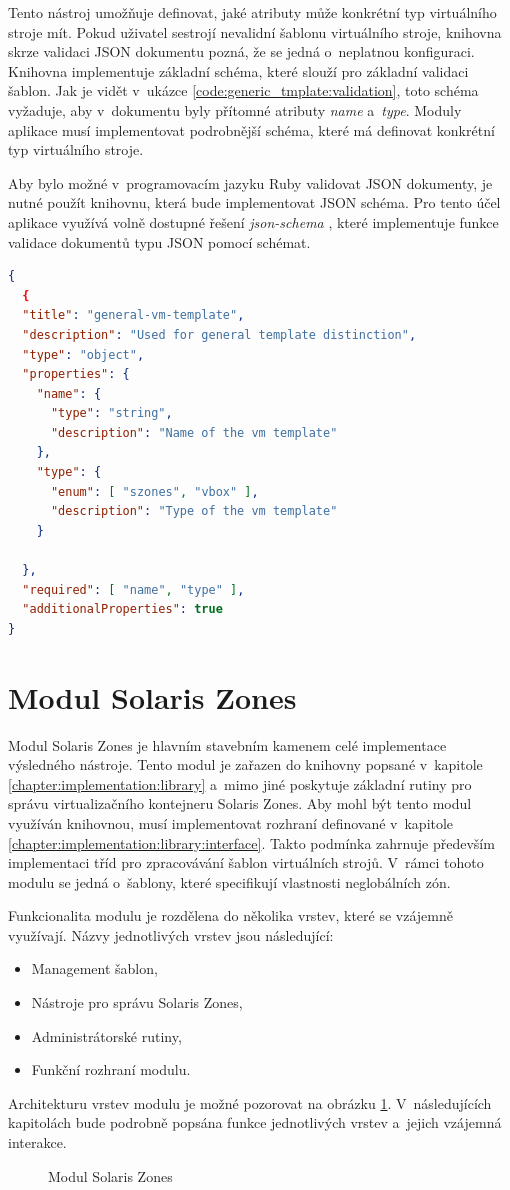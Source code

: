 Tento nástroj umožňuje definovat, jaké atributy může konkrétní typ virtuálního stroje mít. Pokud uživatel sestrojí
nevalidní šablonu virtuálního stroje, knihovna skrze validaci JSON dokumentu pozná, že se jedná o~neplatnou konfiguraci. Knihovna
implementuje základní schéma, které slouží pro základní validaci šablon. Jak je vidět v~ukázce \ref{code:generic_tmplate:validation},
toto schéma vyžaduje, aby v~dokumentu byly přítomné atributy \textit{name} a~\textit{type}. Moduly aplikace musí implementovat
podrobnější schéma, které má definovat konkrétní typ virtuálního stroje.

Aby bylo možné v~programovacím jazyku Ruby validovat JSON dokumenty, je nutné použít knihovnu, která bude implementovat
JSON schéma. Pro tento účel aplikace využívá volně dostupné řešení \textit{json-schema} \cite{json:schema:ruby}, které implementuje
funkce validace dokumentů typu JSON pomocí schémat.
\begin{lstlisting}[language=json, caption={Schéma generické šablony}, float, label={code:generic_tmplate:validation}]  
{
  {
  "title": "general-vm-template",
  "description": "Used for general template distinction",
  "type": "object",
  "properties": {
    "name": {
      "type": "string",
      "description": "Name of the vm template"
    },
    "type": {
      "enum": [ "szones", "vbox" ],
      "description": "Type of the vm template"
    }

  },
  "required": [ "name", "type" ],
  "additionalProperties": true
}
\end{lstlisting}
\section{Modul Solaris Zones}
\label{chapter:implementation:szones}
Modul Solaris Zones je hlavním stavebním kamenem celé implementace výsledného nástroje. Tento modul je zařazen do knihovny
popsané v~kapitole \ref{chapter:implementation:library} a~mimo jiné poskytuje základní rutiny pro správu virtualizačního
kontejneru Solaris Zones. Aby mohl být tento modul využíván knihovnou, musí implementovat rozhraní definované v~kapitole \ref{chapter:implementation:library:interface}.
Takto podmínka zahrnuje především implementaci tříd pro zpracovávání šablon virtuálních strojů. V~rámci tohoto modulu
se jedná o~šablony, které specifikují vlastnosti neglobálních zón. 

Funkcionalita modulu je rozdělena do několika vrstev, které se vzájemně využívají. Názvy jednotlivých vrstev jsou následující:
\begin{itemize}
 \item Management šablon,
 \item Nástroje pro správu Solaris Zones,
 \item Administrátorské rutiny,
 \item Funkční rozhraní modulu.
\end{itemize}
Architekturu vrstev modulu je možné pozorovat na obrázku \ref{image:implemetation:szones}. V~následujících kapitolách
bude podrobně popsána funkce jednotlivých vrstev a~jejich vzájemná interakce.
\begin{figure}
    \centering    
    \caption{Modul Solaris Zones}
    \label{image:implemetation:szones}
\end{figure}
